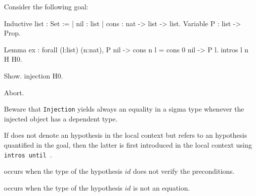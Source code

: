 \Example Consider the following goal:

\begin{coq_example*}
Inductive list : Set :=
  | nil : list
  | cons : nat -> list -> list.
Variable P : list -> Prop.
\end{coq_example*}
\begin{coq_eval}
Lemma ex :
 forall (l:list) (n:nat), P nil -> cons n l = cons 0 nil -> P l.
intros l n H H0.
\end{coq_eval}
\begin{coq_example}
Show.
injection H0.
\end{coq_example}
\begin{coq_eval}
Abort.
\end{coq_eval}

Beware that \texttt{Injection} yields always an equality in a sigma type
whenever the injected object has a dependent type.

\Rem If {\ident} does not denote an hypothesis in the local context
but refers to an hypothesis quantified in the goal, then the
latter is first introduced in the local context using
\texttt{intros until \ident}.

\begin{ErrMsgs}
\item {\ident}  
  occurs when the type of
  the hypothesis $id$ does not verify the preconditions.
\item {} occurs when the type of the
  hypothesis $id$ is not an equation.
\end{ErrMsgs}


